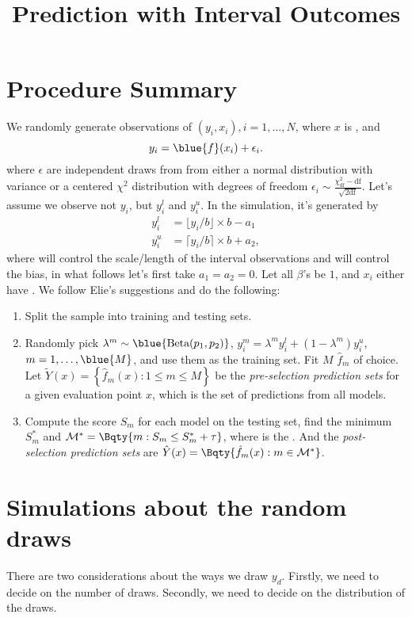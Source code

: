 \documentclass[12pt]{article}
\begin{document}
    \title{Prediction with Interval Outcomes}

    \section{Procedure Summary}


    We randomly generate  observations of \((y_{i},x_{i}), i = 1 ,\dots, N\), where \(x\) is , and
    \begin{equation*}
        y_{i} = \blue{f}(x_{i}) + \epsilon_{i}.
    \end{equation*}
    where \(\epsilon\) are independent draws from from either a normal distribution with variance  or a centered \(\chi^{2}\) distribution with  degrees of freedom \(\epsilon_{i} \sim \frac{\chi^{2}_{\text{df}} - \text{df}}{\sqrt{2 \text{df}}}\). 
    Let's assume we observe not \(y_{i}\), but \(y^{l}_{i}\) and \(y_{i}^{u}\). In the simulation, it's generated by 
    \begin{align*}
        y_{i}^{l} &= \lfloor y_{i}/b \rfloor \times b - a_{1} \\
        y_{i}^{u} &= \lceil y_{i}/b \rceil \times b  + a_{2},
    \end{align*}
    where  will control the scale/length of the interval observations and  will control the bias, in what follows let's first take \(a_{1} = a_{2} = 0\). Let all \(\beta\)'s be \(1\), and \(x_{i}\) either have . We follow Elie's suggestions and do the following:
    \begin{enumerate}
        \item Split the sample into training and testing sets. 
        \item Randomly pick \(\lambda^{m} \sim \blue{\text{Beta}(p_{1}, p_{2})}\),  \(y^{m}_{i} = \lambda^{m}y^{l}_{i} + (1 - \lambda^{m}) y^{u}_{i}\), \(m = 1,\dots, \blue{M}\), and use them as the training set. Fit \(M\)  \(\hat{f}_{m}\) of choice. Let \(\tilde{Y}(x) = \left\{\hat{f}_{m}(x): 1\leq m\leq M\right\}\) be the \textit{pre-selection prediction sets} for a given evaluation point \(x\), which is the set of predictions from all models.
        \item Compute the score \(S_{m}\) for each model on the testing set, find the  minimum \(S_{m}^{*}\) and \(\mathcal{M}^{*} = \Bqty{m: S_{m} \leq S_{m}^{*} + \tau}\), where  is the . And the \textit{post-selection prediction sets} are \(\hat{Y}(x) = \Bqty{\hat{f}_{m}(x): m\in \mathcal{M}^{*}}\).
    \end{enumerate}

    \section{Simulations about the random draws }

    There are two considerations about the ways we draw \(y_{d}\). Firstly, we need to decide on the number of draws. Secondly, we need to decide on the distribution of the draws. 
\end{document}

